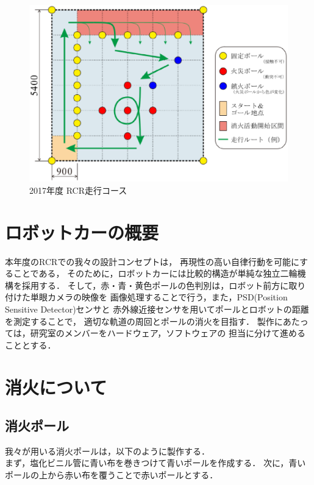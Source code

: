 \documentclass[10pt,a4j]{jarticle}
\begin{document}
\begin{figure}[t]
  \begin{center}
    \includegraphics[width=1.0\hsize]{picture/course.eps}
    \caption{2017年度 RCR走行コース}
    \label{course}
  \end{center}
\end{figure}


\newpage
\section{ロボットカーの概要}
本年度のRCRでの我々の設計コンセプトは，
再現性の高い自律行動を可能にすることである，
そのために，ロボットカーには比較的構造が単純な独立二輪機構を採用する．
そして，赤・青・黄色ポールの色判別は，ロボット前方に取り付けた単眼カメラの映像を
画像処理することで行う，また，PSD(Position Sensitive Detector)センサと
赤外線近接センサを用いてポールとロボットの距離を測定することで，
適切な軌道の周回とポールの消火を目指す．
製作にあたっては，研究室のメンバーをハードウェア，ソフトウェアの
担当に分けて進めることとする．


\section{消火について}
\subsection{消火ポール}
我々が用いる消火ポールは，以下のように製作する．\\
まず，塩化ビニル管に青い布を巻きつけて青いポールを作成する．
次に，青いポールの上から赤い布を覆うことで赤いポールとする．
\end{document}
